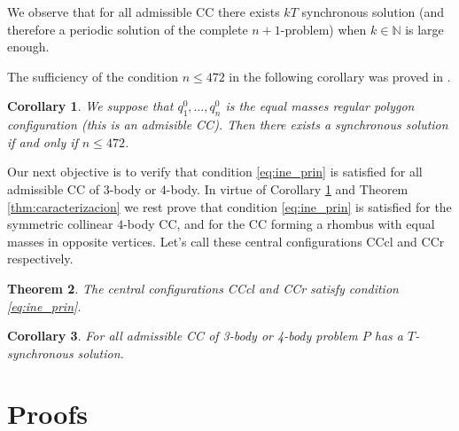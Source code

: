 \documentclass[twoside]{article}
\newtheorem{thm}{Theorem}[section]
\newtheorem{cor}[thm]{Corollary}
\theoremstyle{remark}
\begin{document}
We observe that for all admissible CC there exists $kT$ synchronous solution (and therefore a periodic solution of the complete $n+1$-problem) when $k\in \mathbb{N}$ is  large enough.

The sufficiency of the condition $n\leq 472$ in the following corollary  was proved in \cite{li2013characterization}.

\begin{cor}\label{cor:nleq472}
We suppose that $q_1^0,\ldots,q_n^0$ is the equal masses regular polygon configuration  (this is an admisible CC). Then there exists a synchronous solution if and only if $n\leq 472$.
\end{cor}




Our next objective is to verify that condition \eqref{eq:ine_prin} is satisfied for all admissible CC of 3-body or 4-body. In virtue of Corollary \ref{cor:nleq472} and Theorem \ref{thm:caracterizacion}  we rest prove that condition \eqref{eq:ine_prin} is satisfied for the symmetric collinear $4$-body CC, and for the CC forming a rhombus with equal masses in opposite vertices. Let's call these central configurations CCcl and CCr respectively.



\begin{thm}\label{thm:CC.3.4.satis.cond.adm}
The central configurations CCcl and CCr satisfy condition \eqref{eq:ine_prin}.
\end{thm}

\begin{cor}
For all  admissible CC of 3-body or 4-body  problem $P$ has a $T$-synchronous solution.
\end{cor}




\section{Proofs}
\end{document}
